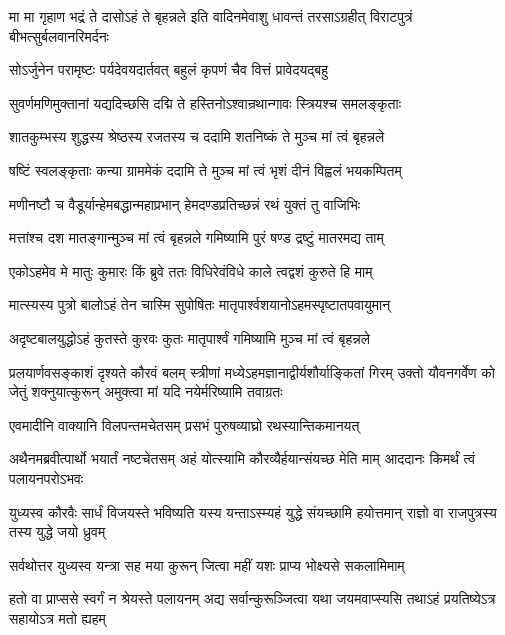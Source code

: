 \threelineshloka
{मा मा गृहाण भद्रं ते दासोऽहं ते बृहन्नले}
{इति वादिनमेवाशु धावन्तं तरसाऽग्रहीत्}
{विराटपुत्रं बीभत्सुर्बलवानरिमर्दनः}


\twolineshloka
{सोऽर्जुनेन परामृष्टः पर्यदेवयदार्तवत्}
{बहुलं कृपणं चैव वित्तं प्रावेदयद्बहु}


\twolineshloka
{सुवर्णमणिमुक्तानां यद्यदिच्छसि दद्मि ते}
{हस्तिनोऽश्वान्रथान्गावः स्त्रियश्च समलङ्कृताः}


\twolineshloka
{शातकुम्भस्य शुद्धस्य श्रेष्ठस्य रजतस्य च}
{ददामि शतनिष्कं ते मुञ्च मां त्वं बृहन्नले}


\twolineshloka
{षष्टिं स्वलङ्कृताः कन्या ग्राममेकं ददामि ते}
{मुञ्च मां त्वं भृशं दीनं विह्वलं भयकम्पितम्}


\twolineshloka
{मणीनष्टौ च वैडूर्यान्हेमबद्धान्महाप्रभान्}
{हेमदण्डप्रतिच्छन्नं रथं युक्तं तु वाजिभिः}


\twolineshloka
{मत्तांश्च दश मातङ्गान्मुञ्च मां त्वं बृहन्नले}
{गमिष्यामि पुरं षण्ड द्रष्टुं मातरमद्य ताम्}


\twolineshloka
{एकोऽहमेव मे मातुः कुमारः किं ब्रुवे ततः}
{विधिरेवंविधे काले त्वद्वशं कुरुते हि माम्}


\twolineshloka
{मात्स्यस्य पुत्रो बालोऽहं तेन चास्मि सुपोषितः}
{मातृपार्श्वशयानोऽहमस्पृष्टातपवायुमान्}


\twolineshloka
{अदृष्टबालयुद्धोऽहं कुतस्ते कुरवः कुतः}
{मातृपार्श्वं गमिष्यामि मुञ्च मां त्वं बृहन्नले}


\onelineshloka
{प्रलयार्णवसङ्काशं दृश्यते कौरवं बलम्}
\threelineshloka
{स्त्रीणां मध्येऽहमज्ञानाद्वीर्यशौर्याङ्कितां गिरम्}
{उक्तो यौवनगर्वेण को जेतुं शक्नुयात्कुरून्}
{अमुक्त्वा मां यदि नयेर्मरिष्यामि तवाग्रतः}



\twolineshloka
{एवमादीनि वाक्यानि विलपन्तमचेतसम्}
{प्रसभं पुरुषव्याघ्रो रथस्यान्तिकमानयत्}


\onelineshloka
{अथैनमब्रवीत्पार्थो भयार्तं नष्टचेतसम्}
\twolineshloka
{अहं योत्स्यामि कौरव्यैर्हयान्संयच्छ मेति माम्}
{आददानः किमर्थं त्वं पलायनपरोऽभवः}


\threelineshloka
{युध्यस्व कौरवैः सार्धं विजयस्ते भविष्यति}
{यस्य यन्ताऽस्म्यहं युद्धे संयच्छामि हयोत्तमान्}
{राज्ञो वा राजपुत्रस्य तस्य युद्धे जयो ध्रुवम्}


\twolineshloka
{सर्वथोत्तर युध्यस्व यन्त्रा सह मया कुरून्}
{जित्वा महीं यशः प्राप्य भोक्ष्यसे सकलामिमाम्}


\onelineshloka
{हतो वा प्राप्ससे स्वर्गं न श्रेयस्ते पलायनम्}
\twolineshloka
{अद्य सर्वान्कुरूञ्जित्वा यथा जयमवाप्स्यसि}
{तथाऽहं प्रयतिष्येऽत्र सहायोऽत्र मतो ह्यहम्}


